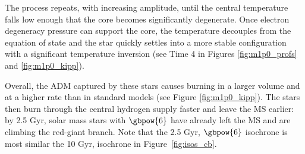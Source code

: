 The process repeats, with increasing amplitude, until the central temperature falls low enough that the core becomes significantly degenerate. Once electron degeneracy pressure can support the core, the temperature decouples from the equation of state and the star quickly settles into a more stable configuration with a significant temperature inversion (see Time 4 in Figures \ref{fig:m1p0_profs} and \ref{fig:m1p0_kipp}).

Overall, the ADM captured by these stars causes burning in a larger volume and at a higher rate than in standard models (see Figure \ref{fig:m1p0_kipp}). The stars then burn through the central hydrogen supply faster and leave the MS earlier: by 2.5 Gyr, solar mass stars with $\gbpow{6}$ have already left the MS and are climbing the red-giant branch. Note that the 2.5 Gyr, $\gbpow{6}$ isochrone is most similar the 10 Gyr, \nodm isochrone in Figure~\ref{fig:isos_cb}.
